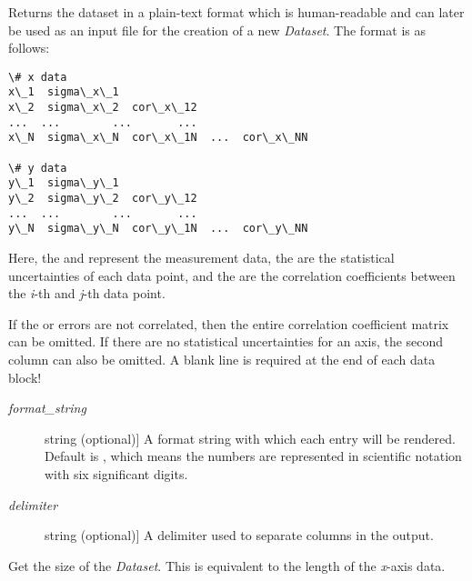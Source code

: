 \documentclass[a4paper,10pt,english]{sphinxmanual}
\begin{document}
\begin{fulllineitems}

\begin{fulllineitems}
\label{index:kafe.dataset.Dataset.get_formatted}
Returns the dataset in a plain-text format which is human-readable and
can later be used as an input file for the creation of a new \emph{Dataset}.
\label{index:get-formatted}
The format is as follows:

\begin{Verbatim}[commandchars=\\\{\}]
\# x data
x\_1  sigma\_x\_1
x\_2  sigma\_x\_2  cor\_x\_12
...  ...        ...       ...
x\_N  sigma\_x\_N  cor\_x\_1N  ...  cor\_x\_NN

\# y data
y\_1  sigma\_y\_1
y\_2  sigma\_y\_2  cor\_y\_12
...  ...        ...       ...
y\_N  sigma\_y\_N  cor\_y\_1N  ...  cor\_y\_NN
\end{Verbatim}

Here, the  and  represent the measurement data, the
 are the statistical uncertainties of each data point, and
the  are the correlation coefficients between the \emph{i}-th
and \emph{j}-th data point.

If the  or  errors are not correlated, then the entire
correlation coefficient matrix can be omitted. If there are no
statistical uncertainties for an axis, the second column can also be
omitted. A blank line is required at the end of each data block!
\begin{description}
\item[{\emph{format\_string}}] \leavevmode{[}string (optional){]}
A format string with which each entry will be rendered. Default is
, which means the numbers are represented in scientific
notation with six significant digits.

\item[{\emph{delimiter}}] \leavevmode{[}string (optional){]}
A delimiter used to separate columns in the output.

\end{description}

\end{fulllineitems}


\begin{fulllineitems}
\label{index:kafe.dataset.Dataset.get_size}
Get the size of the \emph{Dataset}. This is equivalent to the length of the
\emph{x}-axis data.


\end{fulllineitems}
\end{fulllineitems}
\end{document}

